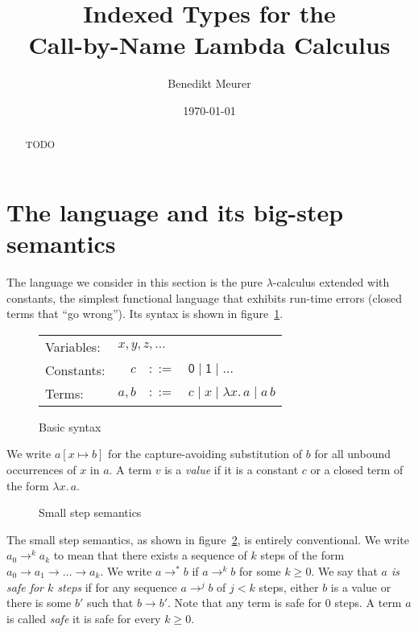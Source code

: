 \documentclass[12pt,a4paper,draft]{article}
\theoremstyle{definition}
\theoremstyle{plain}
\newcommand{\abstr}[2]{\ensuremath{\lambda{#1}.\,{#2}}}
\newcommand{\app}[2]{\ensuremath{{#1}\,{#2}}}
\begin{document}
\author{Benedikt Meurer}
\date{\today}
\title{Indexed Types for the\\Call-by-Name Lambda Calculus}
\maketitle

\begin{abstract}
  TODO
\end{abstract}


\section{The language and its big-step semantics}
\label{sec:The_language_and_its_big_step_semantics}


The language we consider in this section is the pure $\lambda$-calculus extended with constants,
the simplest functional language that exhibits run-time errors (closed terms that ``go wrong'').
Its syntax is shown in figure~\ref{fig:Basic_syntax}.
\begin{figure}[htb]
  \centering
  \begin{tabular}{lrcl}
    Variables: & \multicolumn{3}{l}{$x,y,z,\ldots$} \\
    Constants: & $c$ & $::=$ & $\mathsf{0} \mid \mathsf{1} \mid \ldots$ \\
    Terms: & $a,b$ & $::=$ & $c \mid x \mid \abstr{x}{a} \mid \app{a}{b}$
  \end{tabular}
  \caption{Basic syntax}
  \label{fig:Basic_syntax}
\end{figure}
We write $a[x \mapsto b]$ for the capture-avoiding substitution of $b$ for all unbound occurrences
of $x$ in $a$. A term $v$ is a \emph{value} if it is a constant $c$ or a closed term of the form
$\abstr{x}{a}$.

\begin{figure}[htb]
  \centering
  \caption{Small step semantics}
  \label{fig:Small_step_semantics}
\end{figure}

The small step semantics, as shown in figure~\ref{fig:Small_step_semantics}, is entirely conventional.
We write $a_0 \to^k a_k$ to mean that there exists a sequence of $k$ steps of the form
$a_0 \to a_1 \to \ldots \to a_k$. We write $a \to^* b$ if $a \to^k b$ for some $k \ge 0$. We say that
\emph{$a$ is safe for $k$ steps} if for any sequence $a \to^j b$ of $j < k$ steps, either $b$ is a value
or there is some $b'$ such that $b \to b'$. Note that any term is safe for $0$ steps. A term $a$ is called
\emph{safe} it is safe for every $k \ge 0$.
\end{document}
